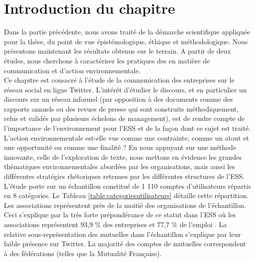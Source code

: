 \section*{Introduction du chapitre}

    Dans la partie précédente, nous avons traité de la démarche scientifique appliquée pour la thèse, du point de vue épistémologique, éthique et méthodologique. Nous présentons maintenant les résultats obtenus sur le terrain. A partir de deux études, nous cherchons à caractériser les pratiques des \oess en matière de communication et d'action environnementale.  \\

    Ce chapitre est consacré à l'étude de la communication des entreprises sur le réseau social en ligne Twitter. L'intérêt d'étudier le discours, et en particulier un discours sur un réseau informel (par opposition à des documents comme des rapports annuels ou des revues de presse qui sont construits méthodiquement, relus et validés par plusieurs échelons de management), est de rendre compte de l'importance de l'environnement pour l'ESS et de la façon dont ce sujet est traité. L'action environnementale est-elle vue comme une contrainte, comme un atout et une opportunité ou comme une finalité ? En nous appuyant sur une méthode innovante, celle de l'exploration de texte, nous mettons en évidence les grandes thématiques environnementales abordées par les organisations, mais aussi les différentes stratégies rhétoriques retenues par les différentes structures de l'ESS. \\

    L’étude porte sur un échantillon constitué de 1 110 comptes d’utilisateurs répartis en 8 catégories. Le Tableau \ref{table:categoriesutilisateurs} détaille cette répartition. Les associations représentent près de la moitié des organisations de l’échantillon. Ceci s’explique par la très forte prépondérance de ce statut dans l’ESS où les associations représentent 93,9 \% des entreprises et 77,7 \% de l’emploi \parencite{observatoire_national_de_leconomie_sociale_et_solidaire_france2017atlas}. La relative sous-représentation des mutuelles dans l’échantillon s’explique par leur faible présence sur Twitter. La majorité des comptes de mutuelles correspondent à des fédérations (telles que la Mutualité Française).

